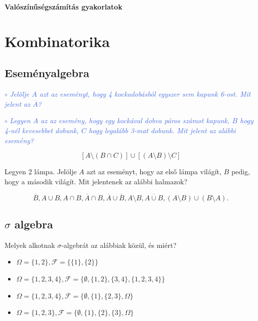 \documentclass[a4paper]{article}
\newenvironment{task}[1]
{\noindent\textcolor{RoyalBlue}{$\circ$ \textit{#1}}

\smallskip

\color{Gray}

}{\bigskip}
\begin{document}
\begin{center}
   \large \textbf{Valószínűségszámítás gyakorlatok}
\end{center}

\vskip 1cm

\section{Kombinatorika}

\subsection{Eseményalgebra}

\begin{task}{Jelölje $A$ azt az eseményt, hogy 4 kockadobásból egyszer sem kapunk 6-ost. Mit jelent az $\overline{A}$?}
\end{task}

\begin{task}{Legyen $A$ az az esemény, hogy egy kockával dobva páros számot kapunk, $B$ hogy 4-nél kevesebbet dobunk, $C$ hogy legalább 3-mat dobunk. Mit jelent az alábbi esemény?}
\end{task}
\[
[A \setminus (B \cap C)] \cup [(A \setminus B) \setminus C]
\]

Legyen 2 lámpa. Jelölje $A$ azt az eseményt, hogy az első lámpa világít, $B$ pedig, hogy a második világít.
Mit jelentenek az alábbi halmazok?

\[
\overline{B}, A \cup B, A \cap B, \overline{A} \cap B, \overline{A} \cup \overline{B}, A \setminus B, \overline{A \cup B}, (A \setminus B) \cup (B \setminus A).
\]

\subsection{$\sigma$ algebra}

Melyek alkotnak $\sigma$-algebrát az alábbiak közül, és miért?

\begin{itemize}
\item $\Omega = \{1, 2\}, \mathcal{F} = \{\{1\}, \{2\}\}$
\item $\Omega = \{1, 2, 3, 4\}, \mathcal{F} = \{\emptyset, \{1, 2\}, \{3, 4\}, \{1, 2, 3, 4\}\}$
\item $\Omega = \{1, 2, 3, 4\}, \mathcal{F} = \{\emptyset, \{1\}, \{2, 3\}, \Omega\}$
\item $\Omega = \{1, 2, 3\}, \mathcal{F} = \{\emptyset, \{1\}, \{2\}, \{3\}, \Omega\}$
\end{itemize}
\end{document}
